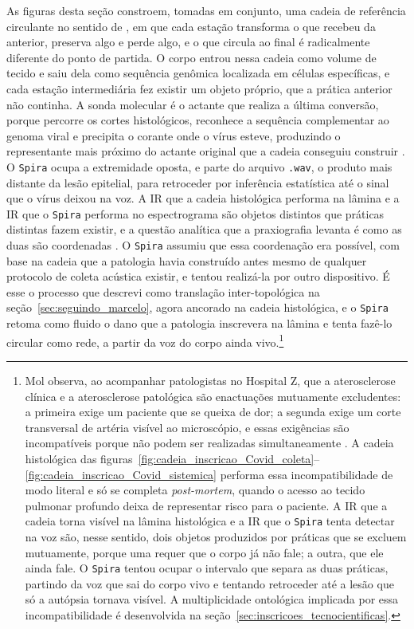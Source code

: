 As figuras desta seção constroem, tomadas em conjunto, uma cadeia de referência circulante no sentido de \textcite{Latour2017Esperanca}, em que cada estação transforma o que recebeu da anterior, preserva algo e perde algo, e o que circula ao final é radicalmente diferente do ponto de partida. O corpo entrou nessa cadeia como volume de tecido e saiu dela como sequência genômica localizada em células específicas, e cada estação intermediária fez existir um objeto próprio, que a prática anterior não continha. A sonda molecular é o actante que realiza a última conversão, porque percorre os cortes histológicos, reconhece a sequência complementar ao genoma viral e precipita o corante onde o vírus esteve, produzindo o representante mais próximo do actante original que a cadeia conseguiu construir \parencite{Latour2017Esperanca}. O \texttt{Spira} ocupa a extremidade oposta, e parte do arquivo \texttt{.wav}, o produto mais distante da lesão epitelial, para retroceder por inferência estatística até o sinal que o vírus deixou na voz. A IR que a cadeia histológica performa na lâmina e a IR que o \texttt{Spira} performa no espectrograma são objetos distintos que práticas distintas fazem existir, e a questão analítica que a praxiografia levanta é como as duas são coordenadas \parencite{mol2002body}. O \texttt{Spira} assumiu que essa coordenação era possível, com base na cadeia que a patologia havia construído antes mesmo de qualquer protocolo de coleta acústica existir, e tentou realizá-la por outro dispositivo. É esse o processo que descrevi como translação inter-topológica na seção~\ref{sec:seguindo_marcelo}, agora ancorado na cadeia histológica, e o \texttt{Spira} retoma como fluido o dano que a patologia inscrevera na lâmina e tenta fazê-lo circular como rede, a partir da voz do corpo ainda vivo.\footnote{Mol observa, ao acompanhar patologistas no Hospital Z, que a aterosclerose clínica e a aterosclerose patológica são enactuações mutuamente excludentes: a primeira exige um paciente que se queixa de dor; a segunda exige um corte transversal de artéria visível ao microscópio, e essas exigências são incompatíveis porque não podem ser realizadas simultaneamente \parencite[pp.~36--37]{mol2002body}. A cadeia histológica das figuras~\ref{fig:cadeia_inscricao_Covid_coleta}--\ref{fig:cadeia_inscricao_Covid_sistemica} performa essa incompatibilidade de modo literal e só se completa \textit{post-mortem}, quando o acesso ao tecido pulmonar profundo deixa de representar risco para o paciente. A IR que a cadeia torna visível na lâmina histológica e a IR que o \texttt{Spira} tenta detectar na voz são, nesse sentido, dois objetos produzidos por práticas que se excluem mutuamente, porque uma requer que o corpo já não fale; a outra, que ele ainda fale. O \texttt{Spira} tentou ocupar o intervalo que separa as duas práticas, partindo da voz que sai do corpo vivo e tentando retroceder até a lesão que só a autópsia tornava visível. A multiplicidade ontológica implicada por essa incompatibilidade é desenvolvida na seção~\ref{sec:inscricoes_tecnocientificas}.}

